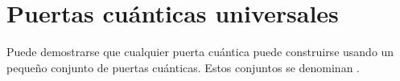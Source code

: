 \section{Puertas cuánticas universales}
Puede demostrarse que cualquier puerta cuántica puede construirse usando un pequeño conjunto de puertas cuánticas.
Estos conjuntos se denominan .

